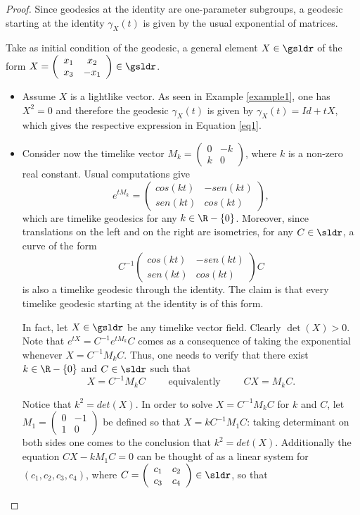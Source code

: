 \documentclass[11pt]{amsart}
\theoremstyle{plain}
\theoremstyle{definition}
\theoremstyle{remark}
\begin{document}
\begin{proof}
Since geodesics at the identity are  one-parameter subgroups,  a geodesic starting at the identity $\gamma_X(t)$ is given by  the usual exponential of matrices.

Take as initial condition of the geodesic, a general element $X\in \gsldr$ of the form 
$X=\left( \begin{array}{ccc}
x_1 & x_2 \\
x_3 & -x_1 \end{array} \right) \in \gsldr$. 

\begin{itemize}
\item Assume $X$ is a lightlike vector. As seen in Example \ref{example1}, one has  $X^2=0$ and  therefore the geodesic $\gamma_X(t)$ is given by $\gamma_X(t)=Id+tX$,  which gives the respective expression in Equation \eqref{eq1}.

\item Consider now the timelike vector $M_k= \left( \begin{array}{ccc}
0 & -k \\
k & 0 \end{array} \right)$, where $k$ is a non-zero real constant. Usual computations   give
$$e^{tM_k}=\left( \begin{array}{ccc}
cos(k t) & -sen(kt) \\ 
sen(kt) & cos(kt) \end{array} \right),$$ which are timelike geodesics for any $k\in \R-\{0\}$. Moreover, since translations on the left and on the right are isometries, for any $C \in \sldr$, a curve of the form 
$$C^{-1} \left( \begin{array}{ccc}
cos(k t) & -sen(kt) \\ 
sen(kt) & cos(kt) \end{array} \right) C$$ is also a timelike geodesic through the identity. The claim is that every timelike geodesic starting at the identity is of this form.

In fact, let $X \in \gsldr$ be any timelike vector field. Clearly $\det(X)> 0$. Note that $e^{tX}=C^{-1} e^{tM_k} C$ comes as a consequence of taking the exponential whenever   
$X = C^{-1} M_k C$. Thus, one needs to verify that there exist $k\in \R-\{0\}$ and $C\in \sldr$ such that 
\begin{equation}
X = C^{-1} M_k C\qquad \mbox{ equivalently } \qquad CX = M_k C.
\end{equation} 

Notice that $k^2 = det (X)$. In order to solve $X = C^{-1} M_k C$ for $k$ and $C$, let $M_1=\left( \begin{array}{ccc}
0 & -1 \\ 
1 & 0 \end{array} \right)$ be defined so that $ X = k C^{-1} M_1 C $: taking determinant on both sides one comes to the conclusion that $k^2 = det (X)$. Additionally the equation  $C X - k M_1 C = 0$ can be thought of as a linear system for $(c_1,c_2,c_3,c_4)$, where $C = \left( \begin{array}{ccc}
c_1 & c_2 \\ 
c_3 & c_4 \end{array} \right)\in \sldr $, so that


\end{itemize}
\end{proof}
\end{document}
